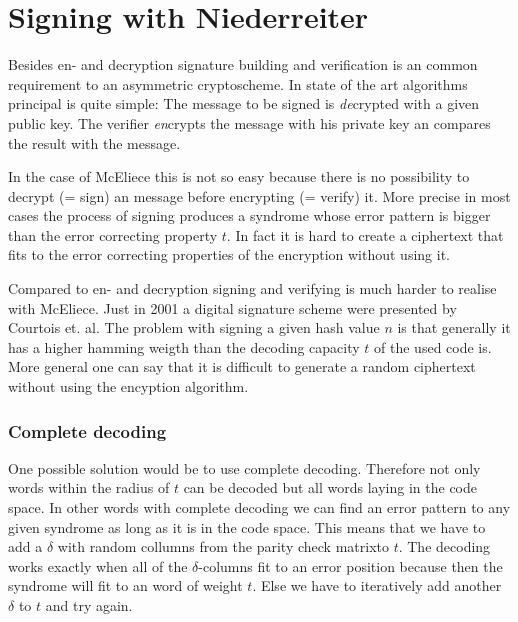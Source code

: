 

\section{Signing with Niederreiter}
\label{signature}
Besides en- and decryption signature building and verification is an common requirement to an asymmetric cryptoscheme. In state of the art algorithms principal is quite simple: The message to be signed is \textit{de}crypted with a given public key. The verifier \textit{en}crypts the message with his private key an compares the result with the message. 

In the case of McEliece this is not so easy because there is no possibility to decrypt (= sign) an message before encrypting (= verify) it. More precise in most cases the process of signing produces a syndrome whose  error pattern is bigger than the error correcting property $t$. In fact it is hard to create a ciphertext that fits to the error correcting properties of the encryption without using it. 


Compared to en- and decryption signing and verifying is much harder to realise with McEliece. Just in 2001 a digital signature scheme were presented by Courtois et. al. The problem with signing a given hash value $n$ is that generally it has a higher hamming weigth than the decoding capacity $t$ of the used code is. More general one can say that it is difficult to generate a random ciphertext without using the encyption algorithm. \cite{courtois2001achieve}


\subsubsection*{Complete decoding}
One possible solution would be to use complete decoding. Therefore not only words within the radius of $t$ can be decoded but all words laying in the code space. In other words with complete decoding we can find an error pattern to any given syndrome as long as it is in the code space. This means that we have to add a $\delta$ with random collumns from the parity check matrixto $t$. The decoding works exactly when all of the $\delta$-columns fit to an error position because then the syndrome will fit to an word of weight $t$. Else we have to iteratively add another $\delta$ to $t$ and try again.


